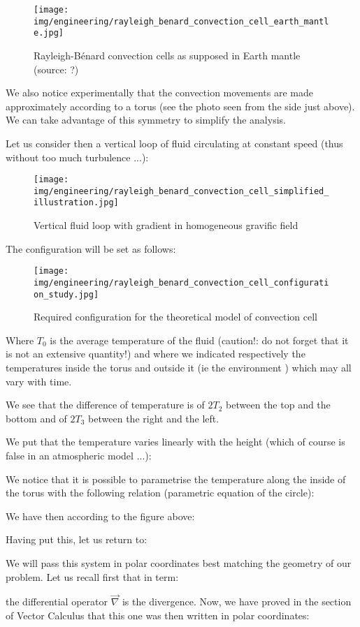 	\begin{figure}[H]
		\centering
		\texttt{[image: img/engineering/rayleigh\_benard\_convection\_cell\_earth\_mantle.jpg]}	
		\caption{Rayleigh-Bénard convection cells as supposed in Earth mantle (source: ?)}
	\end{figure}
	We also notice experimentally that the convection movements are made approximately according to a torus (see the photo seen from the side just above). We can take advantage of this symmetry to simplify the analysis.
	
	Let us consider then a vertical loop of fluid circulating at constant speed (thus without too much turbulence ...):
	\begin{figure}[H]
		\centering
		\texttt{[image: img/engineering/rayleigh\_benard\_convection\_cell\_simplified\_illustration.jpg]}	
		\caption{Vertical fluid loop with gradient in homogeneous gravific field}
	\end{figure}
	The configuration will be set as follows:
	\begin{figure}[H]
		\centering
		\texttt{[image: img/engineering/rayleigh\_benard\_convection\_cell\_configuration\_study.jpg]}	
		\caption{Required configuration for the theoretical model of convection cell}
	\end{figure}
	Where $T_0$ is the average temperature of the fluid (caution!: do not forget that it is not an extensive quantity!) and where we indicated respectively the temperatures inside the torus and outside it (ie the environment ) which may all vary with time.

	We see that the difference of temperature is of $2T_2$ between the top and the bottom and of $2T_3$ between the right and the left.

	We put that the temperature varies linearly with the height (which of course is false in an atmospheric model ...):
	
	We notice that it is possible to parametrise the temperature along the inside of the torus with the following relation (parametric equation of the circle):
	
	We have then according to the figure above:
	
	Having put this, let us return to:
	
	We will pass this system in polar coordinates best matching the geometry of our problem. Let us recall first that in term:
	
	the differential operator $\vec{\nabla}$ is the divergence. Now, we have proved in the section of Vector Calculus that this one was then written in polar coordinates:
	
